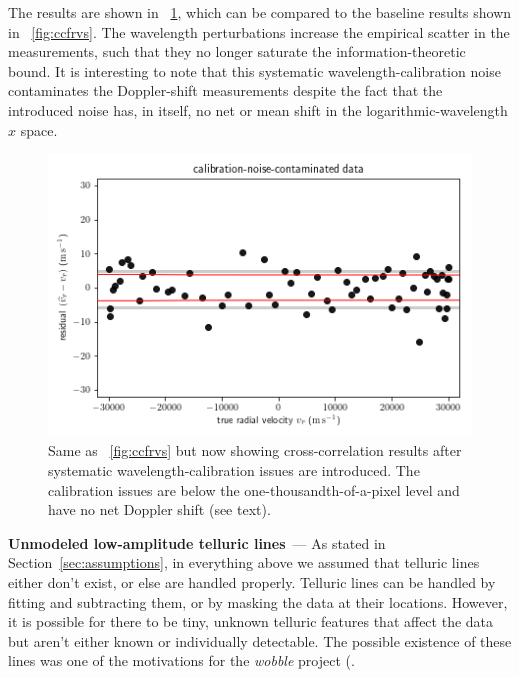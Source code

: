 \documentclass[modern]{aastex631}
\renewcommand{\paragraph}[1]{\bigskip\noindent\textbf{#1}~---}
\newcommand{\sectionname}{Section}
\newcommand{\secref}[1]{\sectionname~\ref{#1}}
\newcommand{\figref}[1]{\figurename~\ref{#1}}
\begin{document}
The results are shown in \figref{fig:calibration}, which can be compared to the baseline results shown in \figref{fig:ccfrvs}.
The wavelength perturbations increase the empirical scatter in the measurements, such that they no longer saturate the information-theoretic bound.
It is interesting to note that this systematic wavelength-calibration noise contaminates the Doppler-shift measurements despite the fact that the introduced noise has, in itself, no net or mean shift in the logarithmic-wavelength $x$ space.

\begin{figure}[tp]
  \begin{mdframed}
    \begin{center}
    \includegraphics[width=\textwidth]{../notebook/calibration.png}
    \end{center}
    \caption{Same as \figref{fig:ccfrvs} but now showing cross-correlation results after systematic wavelength-calibration issues are introduced. The calibration issues are below the one-thousandth-of-a-pixel level and have no net Doppler shift (see text).\label{fig:calibration}}
  \end{mdframed}
\end{figure}

\paragraph{Unmodeled low-amplitude telluric lines}
As stated in \secref{sec:assumptions}, in everything above we assumed that telluric lines either don't exist, or else are handled properly.
Telluric lines can be handled by fitting and subtracting them, or by masking the data at their locations.
However, it is possible for there to be tiny, unknown telluric features that affect the data but aren't either known or individually detectable.
The possible existence of these lines was one of the motivations for the \textsl{wobble} project (\citealt{wobble}.
\end{document}
